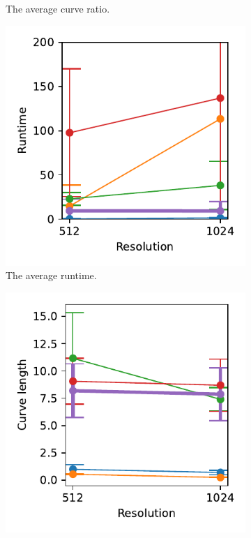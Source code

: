 \begin{figure}[h]
\begin{subfigure}{.3\textwidth}
    \caption{The average curve ratio.}
\end{subfigure}
    \begin{subfigure}{.3\textwidth}
    \centering
    \includegraphics[width=\textwidth]{graphics/eval/runtime_res.pdf}
    \caption{The average runtime.}
\end{subfigure}
    \begin{subfigure}{.3\textwidth}
    \centering
    \includegraphics[width=\textwidth]{graphics/eval/curve_length_res.pdf}

\end{subfigure}
\end{figure}
